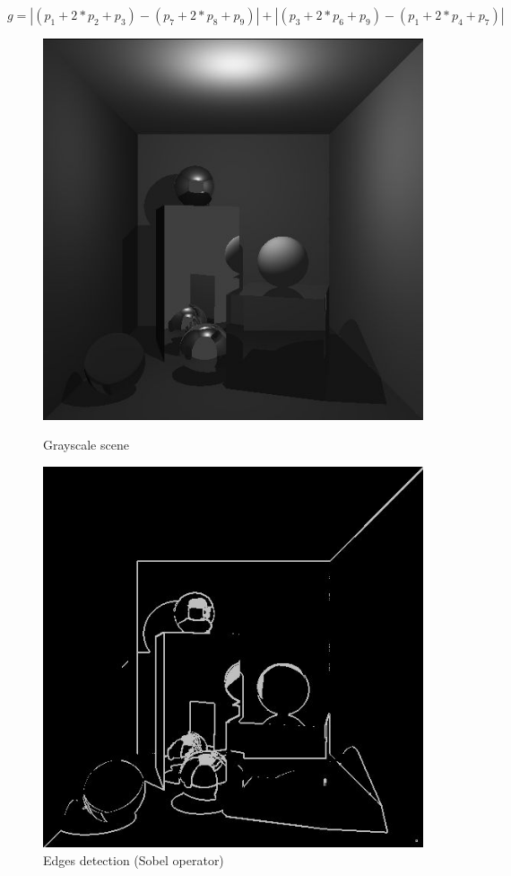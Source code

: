 \begin{equation}
 g = |( p_1 + 2 * p_2 + p_3 ) - ( p_7 + 2 * p_8 + p_9 )| + |( p_3 + 2 * p_6 + p_9 ) - ( p_1 + 2 * p_4 + p_7 )|
\label{eq:sobel}
\end{equation}

\begin{figure}[H]
\centering
{}
    \centering
    \includegraphics[width=\linewidth]{img/antialiasing/grayscale.jpg}
    \caption{Grayscale scene}
    \label{fig:grayscale}
\endminipage
{}
    \centering
    \includegraphics[width=\linewidth]{img/antialiasing/sobel.jpg}
    \caption{Edges detection (Sobel operator)}
    \label{fig:sobel}
\endminipage
\end{figure}


